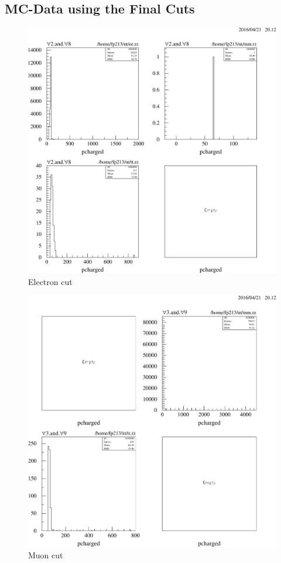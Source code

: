 \documentclass[11pt, a4paper]{article}
\numberwithin{equation}{section}
\begin{document}
\begin{appendix}
\clearpage
\subsection{MC-Data using the Final Cuts}
\label{app:mc_final_cut}

\begin{figure}
	\centering
	\includegraphics[width=1\textwidth]{./data/tag2/final_cuts/cropped/electron_cut.pdf}
	\caption{Electron cut}
\end{figure}

\begin{figure}
	\centering
	\includegraphics[width=1\textwidth]{./data/tag2/final_cuts/cropped/muon_cut.pdf}
	\caption{Muon cut}
\end{figure}


\end{appendix}
\end{document}
